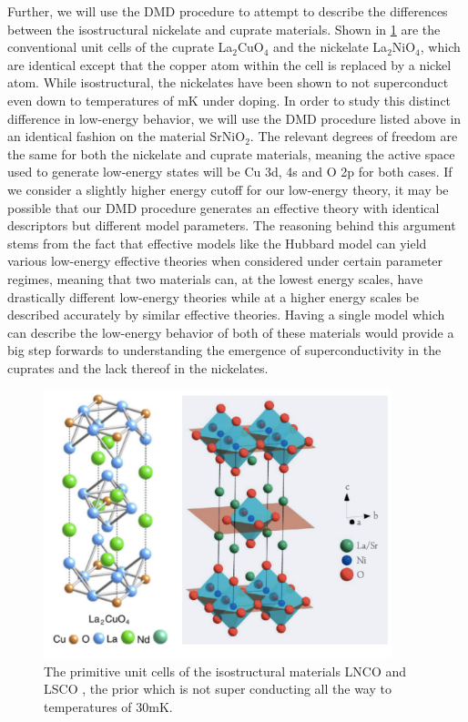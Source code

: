 \documentclass{article}
\begin{document}
Further, we will use the DMD procedure to attempt to describe the differences between the isostructural nickelate and cuprate materials. 
Shown in \ref{fig6} are the conventional unit cells of the cuprate La$_2$CuO$_4$ and the nickelate La$_2$NiO$_4$, which are identical except that the copper atom within the cell is replaced by a nickel atom. 
While isostructural, the nickelates have been shown to not superconduct even down to temperatures of mK \cite{PhysRevB.43.1229} under doping. 
In order to study this distinct difference in low-energy behavior, we will use the DMD procedure listed above in an identical fashion on the material SrNiO$_2$. 
The relevant degrees of freedom are the same for both the nickelate and cuprate materials, meaning the active space used to generate low-energy states will be Cu 3d, 4s and O 2p for both cases. 
If we consider a slightly higher energy cutoff for our low-energy theory, it may be possible that our DMD procedure generates an effective theory with identical descriptors but different model parameters. 
The reasoning behind this argument stems from the fact that effective models like the Hubbard model can yield various low-energy effective theories when considered under certain parameter regimes, meaning that two materials can, at the lowest energy scales, have drastically different low-energy theories while at a higher energy scales be described accurately by similar effective theories. 
Having a single model which can describe the low-energy behavior of both of these materials would provide a big step forwards to understanding the emergence of superconductivity in the cuprates and the lack thereof in the nickelates. 

\begin{figure}[H]
\centering
\includegraphics[width=0.9\textwidth]{Figures/P2-Ni_Cu.pdf}
\caption{\label{fig6} The primitive unit cells of the isostructural materials LNCO \cite{PhysRevB.92.205114} and LSCO \cite{Scalapino2012}, the prior which is not super conducting all the way to temperatures of 30mK.}
\end{figure}


 

 
 
\end{document}
